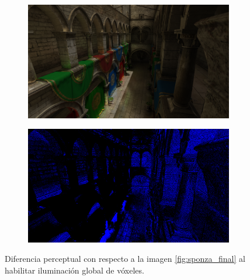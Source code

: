 \begin{figure}[H]
	\centering
	\begin{subfigure}[b]{.49\linewidth}
		\centering
		\captionsetup{justification=centering}
		\includegraphics[width=\linewidth]{media/finals/sponza_vgi.png}
	\end{subfigure}%
	\hspace{0.01\textwidth}
	\begin{subfigure}[b]{.49\linewidth}
		\centering
		\captionsetup{justification=centering}
		\includegraphics[width=\linewidth]{media/finals/sponza_vgi_diff.png}
	\end{subfigure}%
	\caption{Diferencia perceptual con respecto a la imagen \ref{fig:sponza_final} al habilitar iluminación global de vóxeles.}
	\label{fig:sponza_vgi_diff}
\end{figure}
